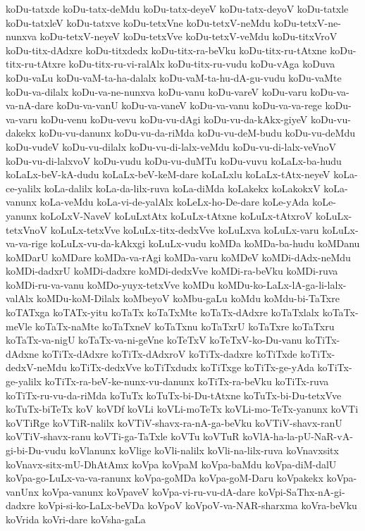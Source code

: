 {koDu-tatxde
koDu-tatx-deMdu
koDu-tatx-deyeV
koDu-tatx-deyoV
koDu-tatxle
koDu-tatxleV
koDu-tatxve
koDu-tetxVne
koDu-tetxV-neMdu
koDu-tetxV-ne-nunxva
koDu-tetxV-neyeV
koDu-tetxVve
koDu-tetxV-veMdu
koDu-titxVroV
koDu-titx-dAdxre
koDu-titxdedx
koDu-titx-ra-beVku
koDu-titx-ru-tAtxne
koDu-titx-ru-tAtxre
koDu-titx-ru-vi-ralAlx
koDu-titx-ru-vudu
koDu-vAga
koDuva
koDu-vaLu
koDu-vaM-ta-ha-dalalx
koDu-vaM-ta-hu-dA-gu-vudu
koDu-vaMte
koDu-va-dilalx
koDu-va-ne-nunxva
koDu-vanu
koDu-vareV
koDu-varu
koDu-va-va-nA-dare
koDu-va-vanU
koDu-va-vaneV
koDu-va-vanu
koDu-va-va-rege
koDu-va-varu
koDu-venu
koDu-vevu
koDu-vu-dAgi
koDu-vu-da-kAkx-giyeV
koDu-vu-dakekx
koDu-vu-danunx
koDu-vu-da-riMda
koDu-vu-deM-budu
koDu-vu-deMdu
koDu-vudeV
koDu-vu-dilalx
koDu-vu-di-lalx-veMdu
koDu-vu-di-lalx-veVnoV
koDu-vu-di-lalxvoV
koDu-vudu
koDu-vu-duMTu
koDu-vuvu
koLaLx-ba-hudu
koLaLx-beV-kA-dudu
koLaLx-beV-keM-dare
koLaLxlu
koLaLx-tAtx-neyeV
koLa-ce-yalilx
koLa-dalilx
koLa-da-lilx-ruva
koLa-diMda
koLakekx
koLakokxV
koLa-vanunx
koLa-veMdu
koLa-vi-de-yalAlx
koLeLx-ho-De-dare
koLe-yAda
koLe-yanunx
koLoLxV-NaveV
koLuLxtAtx
koLuLx-tAtxne
koLuLx-tAtxroV
koLuLx-tetxVnoV
koLuLx-tetxVve
koLuLx-titx-dedxVve
koLuLxva
koLuLx-varu
koLuLx-va-va-rige
koLuLx-vu-da-kAkxgi
koLuLx-vudu
koMDa
koMDa-ba-hudu
koMDanu
koMDarU
koMDare
koMDa-va-rAgi
koMDa-varu
koMDeV
koMDi-dAdx-neMdu
koMDi-dadxrU
koMDi-dadxre
koMDi-dedxVve
koMDi-ra-beVku
koMDi-ruva
koMDi-ru-va-vanu
koMDo-yuyx-tetxVve
koMDu
koMDu-ko-LaLx-lA-ga-li-lalx-valAlx
koMDu-koM-Dilalx
koMbeyoV
koMbu-gaLu
koMdu
koMdu-bi-TaTxre
koTATxga
koTATx-yitu
koTaTx
koTaTxMte
koTaTx-dAdxre
koTaTxlalx
koTaTx-meVle
koTaTx-naMte
koTaTxneV
koTaTxnu
koTaTxrU
koTaTxre
koTaTxru
koTaTx-va-nigU
koTaTx-va-ni-geVne
koTeTxV
koTeTxV-ko-Du-vanu
koTiTx-dAdxne
koTiTx-dAdxre
koTiTx-dAdxroV
koTiTx-dadxre
koTiTxde
koTiTx-dedxV-neMdu
koTiTx-dedxVve
koTiTxdudx
koTiTxge
koTiTx-ge-yAda
koTiTx-ge-yalilx
koTiTx-ra-beV-ke-nunx-vu-danunx
koTiTx-ra-beVku
koTiTx-ruva
koTiTx-ru-vu-da-riMda
koTuTx
koTuTx-bi-Du-tAtxne
koTuTx-bi-Du-tetxVve
koTuTx-biTeTx
koV
koVDf
koVLi
koVLi-moTeTx
koVLi-mo-TeTx-yanunx
koVTi
koVTiRge
koVTiR-nalilx
koVTiV-shavx-ra-nA-ga-beVku
koVTiV-shavx-ranU
koVTiV-shavx-ranu
koVTi-ga-TaTxle
koVTu
koVTuR
koVlA-ha-la-pU-NaR-vA-gi-bi-Du-vudu
koVlanunx
koVlige
koVli-nalilx
koVli-na-lilx-ruva
koVnavxsitx
koVnavx-sitx-mU-DhAtAmx
koVpa
koVpaM
koVpa-baMdu
koVpa-diM-dalU
koVpa-go-LuLx-va-va-ranunx
koVpa-goMDa
koVpa-goM-Daru
koVpakekx
koVpa-vanUnx
koVpa-vanunx
koVpaveV
koVpa-vi-ru-vu-dA-dare
koVpi-SaThx-nA-gi-dadxre
koVpi-si-ko-LaLx-beVDa
koVpoV
koVpoV-va-NAR-sharxma
koVra-beVku
koVrida
koVri-dare
koVsha-gaLa
}
